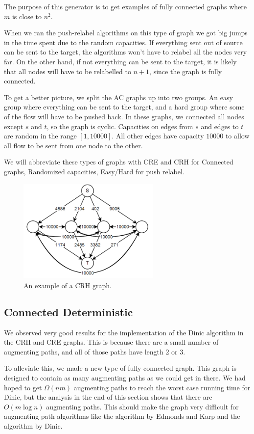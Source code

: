 The purpose of this generator is to get examples of fully connected graphs where $m$ is close to $n^2$.

When we ran the push-relabel algorithms on this type of graph we got big jumps in the time spent due to the random capacities. 
If everything sent out of source can be sent to the target, the algorithms won't have to relabel all the nodes very far.
On the other hand, if not everything can be sent to the target, it is likely that all nodes will have to be relabelled to $n+1$, since the graph is fully connected.

To get a better picture, we split the AC graphs up into two groups. An easy group where everything can be sent to the target, and a hard group where some of the flow will have to be pushed back.
In these graphs, we connected all nodes except $s$ and $t$, so the graph is cyclic. Capacities on edges from $s$ and edges to $t$ are random in the range $[1, 10000]$. 
All other edges have capacity $10000$ to allow all flow to be sent from one node to the other.

We will abbreviate these types of graphs with CRE and CRH for Connected graphs, Randomized capacities, Easy/Hard for push relabel. 

\begin{figure}[!ht]
\centering
\includegraphics[width=70mm]{CRexample.PNG}
\caption{An example of a CRH graph.}
\label{crh example}
\end{figure}


\subsection{Connected Deterministic}
\label{CDGraphsSection}
We observed very good results for the implementation of the Dinic algorithm in the CRH and CRE graphs.
This is because there are a small number of augmenting paths, and all of those paths have length 2 or 3.

To alleviate this, we made a new type of fully connected graph. 
This graph is designed to contain as many augmenting paths as we could get in there.
We had hoped to get $\Omega(nm)$ augmenting paths to reach the worst case running time for Dinic, but the analysis in the end of this section shows that there are $O(m\log n)$ augmenting paths.
This should make the graph very difficult for augmenting path algorithms like the algorithm by Edmonds and Karp and the algorithm by Dinic.

